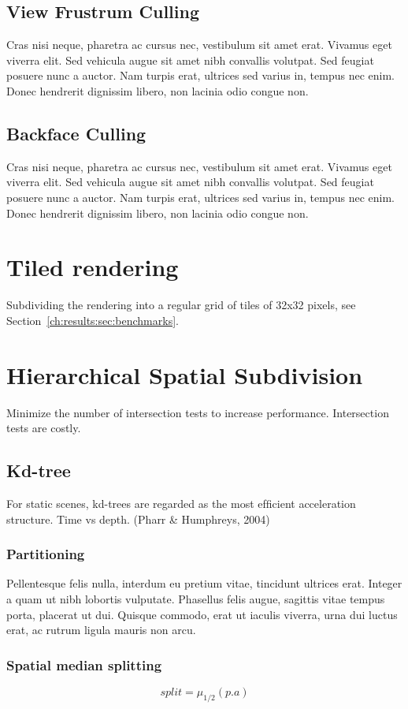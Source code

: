 \subsection{View Frustrum Culling}
Cras nisi neque, pharetra ac cursus nec, vestibulum sit amet erat. Vivamus eget viverra elit. Sed vehicula augue sit amet nibh convallis volutpat. Sed feugiat posuere nunc a auctor. Nam turpis erat, ultrices sed varius in, tempus nec enim. Donec hendrerit dignissim libero, non lacinia odio congue non. 
\subsection{Backface Culling}
Cras nisi neque, pharetra ac cursus nec, vestibulum sit amet erat. Vivamus eget viverra elit. Sed vehicula augue sit amet nibh convallis volutpat. Sed feugiat posuere nunc a auctor. Nam turpis erat, ultrices sed varius in, tempus nec enim. Donec hendrerit dignissim libero, non lacinia odio congue non. 
\section{Tiled rendering}
Subdividing the rendering into a regular grid of tiles of 32x32 pixels, see Section~\ref{ch:results:sec:benchmarks}.
\section{Hierarchical Spatial Subdivision}
Minimize the number of intersection tests to increase performance. Intersection tests are costly.
\subsection{Kd-tree}
For static scenes, kd-trees are regarded as the most efﬁcient acceleration structure\cite{popov07GPURT}.
Time vs depth. (Pharr \& Humphreys, 2004)
\subsubsection{Partitioning}
Pellentesque felis nulla, interdum eu pretium vitae, tincidunt ultrices erat. Integer a quam ut nibh lobortis vulputate. Phasellus felis augue, sagittis vitae tempus porta, placerat ut dui. Quisque commodo, erat ut iaculis viverra, urna dui luctus erat, ac rutrum ligula mauris non arcu.
\subsubsection{Spatial median splitting}
\[
split = \mu_{1/2}(p.a)
\]
